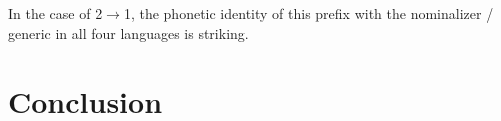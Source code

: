 \documentclass[oldfontcommands,oneside,a4paper,11pt]{article}
\begin{document}
In the case of 2$\rightarrow$1, the phonetic identity of this prefix with the nominalizer / generic in all four languages is striking.

\section{Conclusion}



\end{document}
